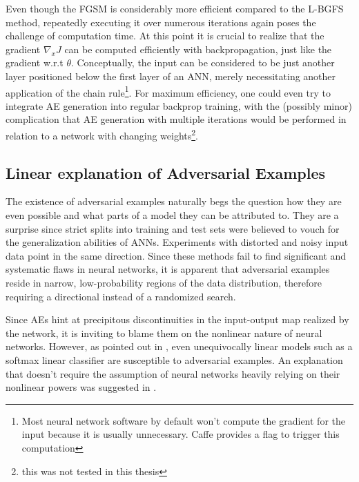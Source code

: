 \documentclass[11pt, a4paper]{article}
\begin{document}

Even though the FGSM is considerably more efficient compared to the L-BGFS method, repeatedly executing it over numerous iterations again poses the challenge of computation time. At this point it is crucial to realize that the gradient $\nabla_x J$ can be computed efficiently with backpropagation, just like the gradient w.r.t $\theta$. Conceptually, the input can be considered to be just another layer positioned below the first layer of an ANN, merely necessitating another application of the chain rule\footnote{Most neural network software by default won't compute the gradient for the input because it is usually unnecessary. Caffe provides a flag to trigger this computation}. For maximum efficiency, one could even try to integrate AE generation into regular backprop training, with the (possibly minor) complication that AE generation with multiple iterations would be performed in relation to a network with changing weights\footnote{this was not tested in this thesis}.

\subsection{Linear explanation of Adversarial Examples}
\label{subsec:ae-linear-explanation}
The existence of adversarial examples naturally begs the question how they are even possible and what parts of a model they can be attributed to. They are a surprise since strict splits into training and test sets were believed to vouch for the generalization abilities of ANNs. Experiments with distorted and noisy input data point in the same direction. Since these methods fail to find significant and systematic flaws in neural networks, it is apparent that adversarial examples reside in narrow, low-probability regions of the data distribution, therefore requiring a directional instead of a randomized search.

Since AEs hint at precipitous discontinuities in the input-output map realized by the network, it is inviting to blame them on the nonlinear nature of neural networks. However, as pointed out in \cite{breaking-linear-classifiers-on-imgagenet}, even unequivocally linear models such as a softmax linear classifier are susceptible to adversarial examples. An explanation that doesn't require the assumption of neural networks heavily relying on their nonlinear powers was suggested in \cite{explaining-and-harnessing-adversarial-examples}.
\end{document}
